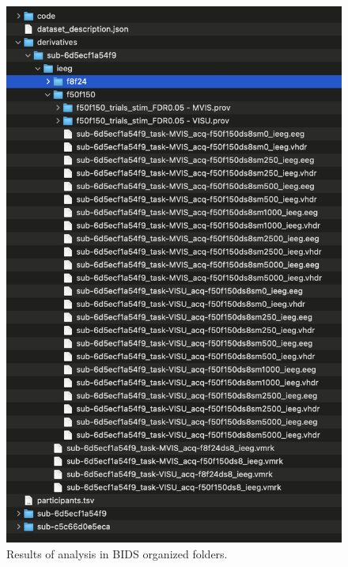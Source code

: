 \documentclass[a4paper]{article}
\begin{document}
\begin{figure}[H]
\begin{center}
\includegraphics[scale=0.6]{BidsDerivativesAfterAnalysis.png}
\end{center}
\caption{\label{ConnectCleanerBidsSubjectUI}Results of analysis in BIDS organized folders.}
\end{figure}
\end{document}
